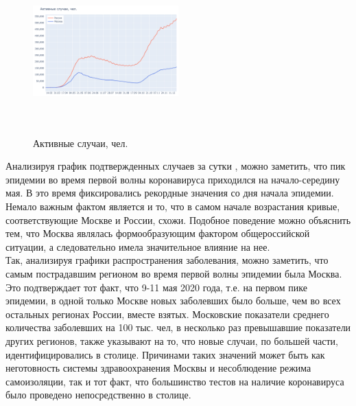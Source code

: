 \documentclass[a4paper, 12pt]{extarticle}
\begin{document}
\begin{figure}
    \centering
    \vspace{-20pt}
    \includegraphics[height=180pt, width=0.50\textwidth]{../plots/2active_cases_russia_moscow.pdf}
    \caption{Активные случаи, чел.}
    \label{fig:day_active_russia_moscow}
\end{figure}

Анализируя график подтвержденных случаев за сутки , можно заметить, что пик эпидемии во время первой волны коронавируса приходился на начало-середину мая. В это время фиксировались рекордные значения со дня начала эпидемии. Немало важным фактом является и то, что в самом начале возрастания кривые, соответствующие Москве и России, схожи. Подобное поведение можно объяснить тем, что Москва являлась формообразующим фактором общероссийской ситуации, а следовательно имела значительное влияние на нее.
\\

Так, анализируя графики распространения заболевания, можно заметить, что самым пострадавшим регионом во время первой волны эпидемии была Москва. Это подтверждает тот факт, что 9-11 мая 2020 года, т.е. на первом пике эпидемии, в одной только Москве новых заболевших было больше, чем во всех остальных регионах России, вместе взятых. Московские показатели среднего количества заболевших на 100 тыс. чел, в несколько раз превышавшие показатели других регионов, также указывают на то, что новые случаи, по большей части, идентифицировались в столице. Причинами таких значений может быть как неготовность системы здравоохранения Москвы и несоблюдение режима самоизоляции, так и тот факт, что большинство тестов на наличие коронавируса было проведено непосредственно в столице.
\end{document}
